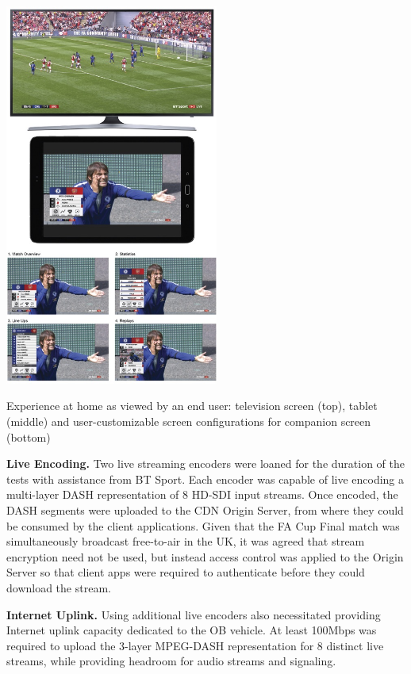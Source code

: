 \documentclass[sigchi-a, authorversion]{acmart}
\begin{document}
\begin{marginfigure}
\hspace*{-0.5cm}
    \includegraphics[width=7cm]{Figures/footballathome1.jpg}
    \caption{Experience at home as viewed by an end user: television screen (top), tablet (middle) and user-customizable screen configurations for companion screen (bottom)}
    \label{fig:homeexperience}
\end{marginfigure}

\vspace{5pt}\noindent\textbf{Live Encoding.} Two live streaming encoders were loaned for the duration
of the tests with assistance from BT Sport. Each encoder was capable of live
encoding a multi-layer DASH representation of 8 HD-SDI input streams. Once
encoded, the DASH segments were uploaded to the CDN Origin Server, from where
they could be consumed by the client applications. Given that the FA Cup Final
match was simultaneously broadcast free-to-air in the UK, it was agreed that
stream encryption need not be used, but instead access control was applied to
the Origin Server so that client apps were required to authenticate before they
could download the stream.

\vspace{5pt}\noindent\textbf{Internet Uplink.} Using additional live encoders
also necessitated providing Internet uplink capacity dedicated to the OB vehicle.
At least 100Mbps was required to upload the 3-layer MPEG-DASH representation for
8 distinct live streams, while providing headroom for audio streams and signaling.
\end{document}
